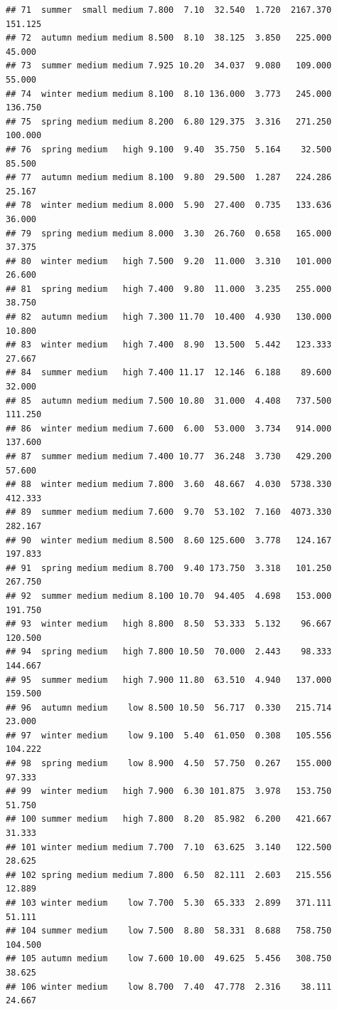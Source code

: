 \documentclass[]{report}
\begin{document}
\begin{verbatim}
## 71  summer  small medium 7.800  7.10  32.540  1.720  2167.370 151.125
## 72  autumn medium medium 8.500  8.10  38.125  3.850   225.000  45.000
## 73  summer medium medium 7.925 10.20  34.037  9.080   109.000  55.000
## 74  winter medium medium 8.100  8.10 136.000  3.773   245.000 136.750
## 75  spring medium medium 8.200  6.80 129.375  3.316   271.250 100.000
## 76  spring medium   high 9.100  9.40  35.750  5.164    32.500  85.500
## 77  autumn medium medium 8.100  9.80  29.500  1.287   224.286  25.167
## 78  winter medium medium 8.000  5.90  27.400  0.735   133.636  36.000
## 79  spring medium medium 8.000  3.30  26.760  0.658   165.000  37.375
## 80  winter medium   high 7.500  9.20  11.000  3.310   101.000  26.600
## 81  spring medium   high 7.400  9.80  11.000  3.235   255.000  38.750
## 82  autumn medium   high 7.300 11.70  10.400  4.930   130.000  10.800
## 83  winter medium   high 7.400  8.90  13.500  5.442   123.333  27.667
## 84  summer medium   high 7.400 11.17  12.146  6.188    89.600  32.000
## 85  autumn medium medium 7.500 10.80  31.000  4.408   737.500 111.250
## 86  winter medium medium 7.600  6.00  53.000  3.734   914.000 137.600
## 87  summer medium medium 7.400 10.77  36.248  3.730   429.200  57.600
## 88  winter medium medium 7.800  3.60  48.667  4.030  5738.330 412.333
## 89  summer medium medium 7.600  9.70  53.102  7.160  4073.330 282.167
## 90  winter medium medium 8.500  8.60 125.600  3.778   124.167 197.833
## 91  spring medium medium 8.700  9.40 173.750  3.318   101.250 267.750
## 92  summer medium medium 8.100 10.70  94.405  4.698   153.000 191.750
## 93  winter medium   high 8.800  8.50  53.333  5.132    96.667 120.500
## 94  spring medium   high 7.800 10.50  70.000  2.443    98.333 144.667
## 95  summer medium   high 7.900 11.80  63.510  4.940   137.000 159.500
## 96  autumn medium    low 8.500 10.50  56.717  0.330   215.714  23.000
## 97  winter medium    low 9.100  5.40  61.050  0.308   105.556 104.222
## 98  spring medium    low 8.900  4.50  57.750  0.267   155.000  97.333
## 99  winter medium   high 7.900  6.30 101.875  3.978   153.750  51.750
## 100 summer medium   high 7.800  8.20  85.982  6.200   421.667  31.333
## 101 winter medium medium 7.700  7.10  63.625  3.140   122.500  28.625
## 102 spring medium medium 7.800  6.50  82.111  2.603   215.556  12.889
## 103 winter medium    low 7.700  5.30  65.333  2.899   371.111  51.111
## 104 summer medium    low 7.500  8.80  58.331  8.688   758.750 104.500
## 105 autumn medium    low 7.600 10.00  49.625  5.456   308.750  38.625
## 106 winter medium    low 8.700  7.40  47.778  2.316    38.111  24.667

\end{verbatim}
\end{document}
